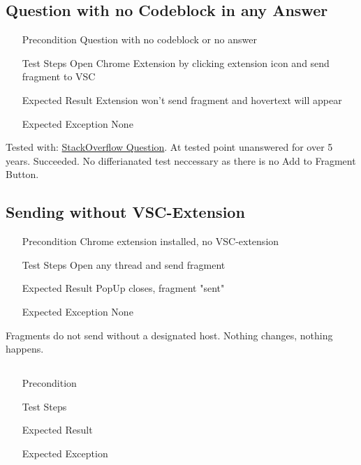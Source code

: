 \documentclass{report}
\begin{document}
\subsection*{Question with no Codeblock in any Answer}
\begin{itemize}
	\item[Precondition] Question with no codeblock or no answer
	\item[Test Steps] Open Chrome Extension by clicking extension icon and send fragment to VSC
	\item[Expected Result] Extension won't send fragment and hovertext will appear
	\item[Expected Exception] None
\end{itemize}
Tested with: \href{https://stackoverflow.com/questions/21446532/jboss-and-intellij-use-jboss-plugin-to-run-and-deploy-or-use-maven}{StackOverflow Question}.
At tested point unanswered for over 5 years. Succeeded. No differianated test neccessary as there is no Add to Fragment Button.

\subsection*{Sending without VSC-Extension}
\begin{itemize}
	\item[Precondition] Chrome extension installed, no VSC-extension
	\item[Test Steps] Open any thread and send fragment
	\item[Expected Result] PopUp closes, fragment "sent" 
	\item[Expected Exception] None
\end{itemize}
Fragments do not send without a designated host. Nothing changes, nothing happens.

\subsection*{}
\begin{itemize}
	\item[Precondition]
	\item[Test Steps]
	\item[Expected Result]
	\item[Expected Exception]
\end{itemize}
\end{document}
